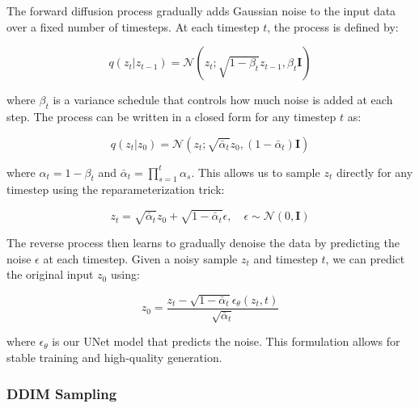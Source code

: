 The forward diffusion process gradually adds Gaussian noise to the input data over a fixed number of timesteps. At each timestep $t$, the process is defined by:

\begin{equation}
    q(z_t|z_{t-1}) = \mathcal{N}(z_t; \sqrt{1-\beta_t}z_{t-1}, \beta_t\mathbf{I})
\end{equation}

\noindent where $\beta_t$ is a variance schedule that controls how much noise is added at each step. The process can be written in a closed form for any timestep $t$ as:

\begin{equation}
    q(z_t|z_0) = \mathcal{N}(z_t; \sqrt{\bar{\alpha}_t}z_0, (1-\bar{\alpha}_t)\mathbf{I})
\end{equation}

\noindent where $\alpha_t = 1-\beta_t$ and $\bar{\alpha}_t = \prod_{s=1}^t \alpha_s$. This allows us to sample $z_t$ directly for any timestep using the reparameterization trick:

\begin{equation}
    z_t = \sqrt{\bar{\alpha}_t}z_0 + \sqrt{1-\bar{\alpha}_t}\epsilon, \quad \epsilon \sim \mathcal{N}(0, \mathbf{I})
\end{equation}

The reverse process then learns to gradually denoise the data by predicting the noise $\epsilon$ at each timestep. Given a noisy sample $z_t$ and timestep $t$, we can predict the original input $z_0$ using:

\begin{equation}
    z_0 = \frac{z_t - \sqrt{1-\bar{\alpha}_t}\epsilon_\theta(z_t,t)}{\sqrt{\bar{\alpha}_t}}
\end{equation}

\noindent where $\epsilon_\theta$ is our UNet model that predicts the noise. This formulation allows for stable training and high-quality generation.

\subsubsection{DDIM Sampling}
\label{sec:ddim_sampling}

